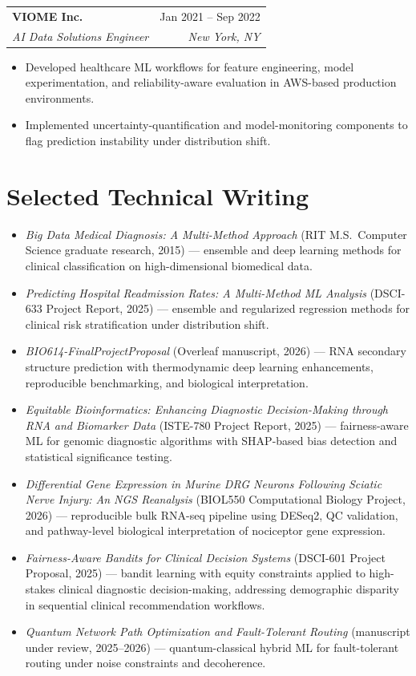 \documentclass[11pt]{article}
\makeatletter
\newcommand{\entry}[4]{
  \noindent\begin{tabularx}{\textwidth}{@{}Xr@{}}
    \textbf{#1} & #2 \\
    \textit{#3} & \textit{#4}
  \end{tabularx}\vspace{2pt}
}
\makeatother
\begin{document}
\entry{VIOME Inc.}{Jan 2021 -- Sep 2022}{AI Data Solutions Engineer}{New York, NY}
\begin{itemize}
  \item Developed healthcare ML workflows for feature engineering, model experimentation, and reliability-aware evaluation in AWS-based production environments.
  \item Implemented uncertainty-quantification and model-monitoring components to flag prediction instability under distribution shift.
\end{itemize}

\section{Selected Technical Writing}
\begin{itemize}
  \item \textit{Big Data Medical Diagnosis: A Multi-Method Approach} (RIT M.S.\ Computer Science graduate research, 2015) --- ensemble and deep learning methods for clinical classification on high-dimensional biomedical data.
  \item \textit{Predicting Hospital Readmission Rates: A Multi-Method ML Analysis} (DSCI-633 Project Report, 2025) --- ensemble and regularized regression methods for clinical risk stratification under distribution shift.
  \item \textit{BIO614-FinalProjectProposal} (Overleaf manuscript, 2026) --- RNA secondary structure prediction with thermodynamic deep learning enhancements, reproducible benchmarking, and biological interpretation.
  \item \textit{Equitable Bioinformatics: Enhancing Diagnostic Decision-Making through RNA and Biomarker Data} (ISTE-780 Project Report, 2025) --- fairness-aware ML for genomic diagnostic algorithms with SHAP-based bias detection and statistical significance testing.
  \item \textit{Differential Gene Expression in Murine DRG Neurons Following Sciatic Nerve Injury: An NGS Reanalysis} (BIOL550 Computational Biology Project, 2026) --- reproducible bulk RNA-seq pipeline using DESeq2, QC validation, and pathway-level biological interpretation of nociceptor gene expression.
  \item \textit{Fairness-Aware Bandits for Clinical Decision Systems} (DSCI-601 Project Proposal, 2025) --- bandit learning with equity constraints applied to high-stakes clinical diagnostic decision-making, addressing demographic disparity in sequential clinical recommendation workflows.
  \item \textit{Quantum Network Path Optimization and Fault-Tolerant Routing} (manuscript under review, 2025--2026) --- quantum-classical hybrid ML for fault-tolerant routing under noise constraints and decoherence.
\end{itemize}
\end{document}
